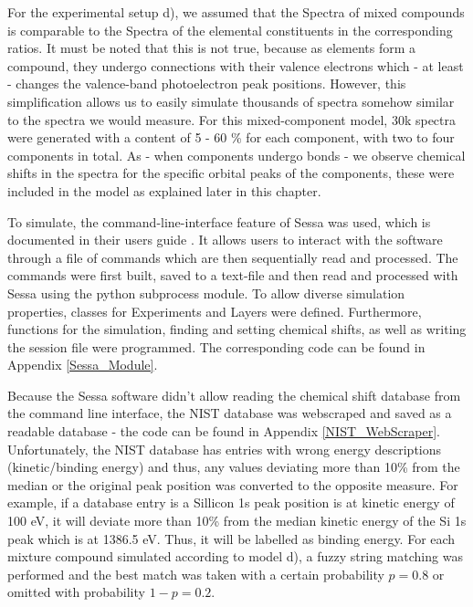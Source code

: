 For the experimental setup d), we assumed that the Spectra of mixed compounds is comparable to the Spectra of the elemental constituents in the corresponding ratios. It must be noted that this is not true, because as elements form a compound, they undergo connections with their valence electrons which - at least - changes the valence-band photoelectron peak positions. However, this simplification allows us to easily simulate thousands of spectra somehow similar to the spectra we would measure. For this mixed-component model, 30k spectra were generated with a content of 5 - 60 \% for each component, with two to four components in total. As - when components undergo bonds - we observe chemical shifts in the spectra for the specific orbital peaks of the components, these were included in the model as explained later in this chapter.
 
To simulate, the command-line-interface feature of Sessa was used, which is documented in their users guide \cite{werner_simulation_2021}. It allows users to interact with the software through a file of commands which are then sequentially read and processed. The commands were first built, saved to a text-file and then read and processed with Sessa using the python subprocess module. To allow diverse simulation properties, classes for Experiments and Layers were defined. Furthermore, functions for the simulation, finding and setting chemical shifts, as well as writing the session file were programmed. The corresponding code can be found in Appendix \ref{Sessa_Module}.

Because the Sessa software didn't allow reading the chemical shift database from the command line interface, the NIST database was webscraped and saved as a readable database - the code can be found in Appendix \ref{NIST_WebScraper}. Unfortunately, the NIST database has entries with wrong energy descriptions (kinetic/binding energy) and thus, any values deviating more than 10\% from the median or the original peak position was converted to the opposite measure. For example, if a database entry is a Sillicon 1s peak position is at kinetic energy of 100 eV, it will deviate more than 10\% from the median kinetic energy of the Si 1s peak which is at 1386.5 eV. Thus, it will be labelled as binding energy. 
For each mixture compound simulated according to model d), a fuzzy string matching was performed and the best match was taken with a certain probability $p=0.8$ or omitted with probability $1-p = 0.2$.


